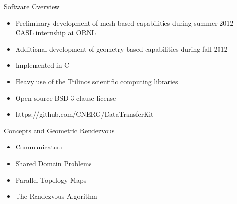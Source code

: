 \documentclass{beamer}
\begin{document}
\begin{frame}{Software Overview}

  \begin{itemize}
  \item Preliminary development of mesh-based capabilities during
    summer 2012 CASL internship at ORNL
    \bigskip
  \item Additional development of geometry-based capabilities during
    fall 2012
    \bigskip
  \item Implemented in C++
    \bigskip
  \item Heavy use of the Trilinos scientific computing libraries
    \bigskip
  \item Open-source BSD 3-clause license
    \bigskip
  \item https://github.com/CNERG/DataTransferKit
  \end{itemize}
  
\end{frame}

\begin{frame}{Concepts and Geometric Rendezvous}

  \begin{itemize}
  \item Communicators
    \bigskip
  \item Shared Domain Problems
    \bigskip
  \item Parallel Topology Maps
    \bigskip
  \item The Rendezvous Algorithm
  \end{itemize}

\end{frame}
\end{document}

